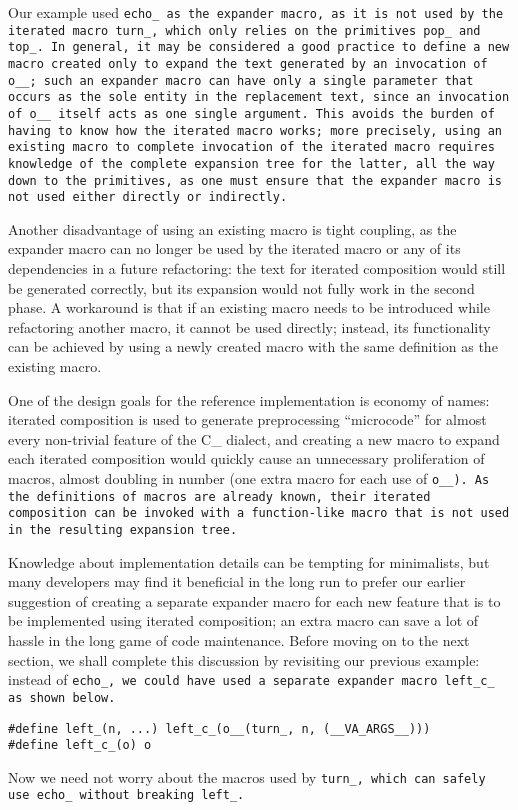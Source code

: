 
Our example used \tt{echo_} as the expander macro,
as it is not used by the iterated macro \tt{turn_},
which only relies on the primitives \tt{pop_} and \tt{top_}.
In general, it may be considered a good practice to define a new macro
created only to expand the text generated by an invocation of \tt{o__};
such an expander macro can have only a single parameter
that occurs as the sole entity in the replacement text,
since an invocation of \tt{o__} itself acts as one single argument.
This avoids the burden of having to know how the iterated macro works;
more precisely, using an existing macro to complete invocation of the
iterated macro requires knowledge of the complete expansion tree for
the latter, all the way down to the primitives, as one must ensure
that the expander macro is not used either directly or indirectly.

Another disadvantage of using an existing macro is tight coupling,
as the expander macro can no longer be used by the iterated
macro or any of its dependencies in a future refactoring:
the text for iterated composition would still be generated correctly,
but its expansion would not fully work in the second phase.
A workaround is that if an existing macro needs to be introduced
while refactoring another macro, it cannot be used directly;
instead, its functionality can be achieved by using a newly
created macro with the same definition as the existing macro.

\note One of the design goals for the reference implementation is
economy of names: iterated composition is used to generate preprocessing
``microcode'' for almost every non-trivial feature of the C\_ dialect,
and creating a new macro to expand each iterated composition would quickly
cause an unnecessary proliferation of macros, almost doubling in number
(one extra macro for each use of \tt{o__}).
As the definitions of macros are already known,
their iterated composition can be invoked with a function-like macro
that is not used in the resulting expansion tree.

Knowledge about implementation details can be tempting for minimalists,
but many developers may find it beneficial in the long run to
prefer our earlier suggestion of creating a separate expander
macro for each new feature that is to be implemented using iterated composition;
an extra macro can save a lot of hassle in the long game of code maintenance.
Before moving on to the next section, we shall complete this discussion
by revisiting our previous example: instead of \tt{echo_}, we could
have used a separate expander macro \tt{left_c_} as shown below.

\tt{#define left_(n, ...) left_c_(o__(turn_, n, (__VA_ARGS__)))}\\
\tt{#define left_c_(o) o}\\
\elbat

Now we need not worry about the macros used by \tt{turn_},
which can safely use \tt{echo_} without breaking \tt{left_}.
